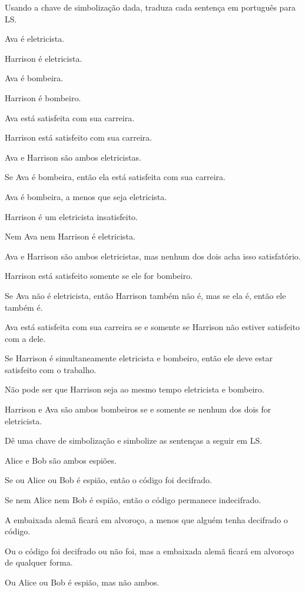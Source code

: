 \solutions
\problempart Usando a chave de simbolização dada, traduza cada sentença em português para LS.
\label{pr.avacareer}
\begin{ekey}
\item[E$_1$:] Ava é eletricista.
\item[E$_2$:] Harrison é eletricista.
\item[F$_1$:] Ava é bombeira.
\item[F$_2$:] Harrison é bombeiro.
\item[S$_1$:] Ava está satisfeita com sua carreira.
\item[S$_2$:] Harrison está satisfeito com sua carreira.
\end{ekey}
\begin{earg}
\item Ava e Harrison são ambos eletricistas.
\item Se Ava é bombeira, então ela está satisfeita com sua carreira.
\item Ava é bombeira, a menos que seja eletricista.
\item Harrison é um eletricista insatisfeito.
\item Nem Ava nem Harrison é eletricista.
\item Ava e Harrison são ambos eletricistas, mas nenhum dos dois acha isso satisfatório.
\item Harrison está satisfeito somente se ele for bombeiro.
\item Se Ava não é eletricista, então Harrison também não é, mas se ela é, então ele também é.
\item Ava está satisfeita com sua carreira se e somente se Harrison não estiver satisfeito com a dele.
\item Se Harrison é simultaneamente eletricista e bombeiro, então ele deve estar satisfeito com o trabalho.
\item Não pode ser que Harrison seja ao mesmo tempo eletricista e bombeiro.
\item Harrison e Ava são ambos bombeiros se e somente se nenhum dos dois for eletricista.
\end{earg}




\solutions
\problempart
\label{pr.spies}
Dê uma chave de simbolização e simbolize as sentenças a seguir em LS.
\begin{earg}
\item Alice e Bob são ambos espiões.
\item Se ou Alice ou Bob é espião, então o código foi decifrado.
\item Se nem Alice nem Bob é espião, então o código permanece indecifrado.
\item A embaixada alemã ficará em alvoroço, a menos que alguém tenha decifrado o código.
\item Ou o código foi decifrado ou não foi, mas a embaixada alemã ficará em alvoroço de qualquer forma.
\item Ou Alice ou Bob é espião, mas não ambos.
\end{earg}



